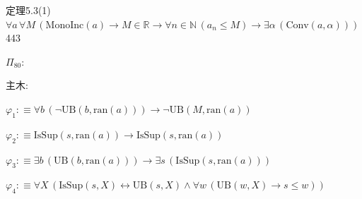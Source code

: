 \begin{fullproof}{定理5.3(1)}{$\forall a\,\forall M\,(\mathrm{MonoInc}(a) \to M \in \mathbb{R} \to \forall n \in \mathbb{N}\,(a_{n} \leq M) \to \exists \alpha\,(\mathrm{Conv}(a,\alpha)))$}{443}
\begin{ptree}
\noLine
{}
\end{ptree}
\noindent$\Pi_{80}$:
\begin{ptree}
\noLine
{}
\noLine
{}
\end{ptree}
\noindent 主木:
\begin{ptree}
\noLine
{}
\noLine
{}
\end{ptree}
\begin{abbrevlist}
\item $\varphi_{1} :\equiv \forall b\,(\neg \mathrm{UB}(b,\mathrm{ran}(a))) \to \neg \mathrm{UB}(M,\mathrm{ran}(a))$
\item $\varphi_{2} :\equiv \mathrm{IsSup}(s,\mathrm{ran}(a)) \to \mathrm{IsSup}(s,\mathrm{ran}(a))$
\item $\varphi_{3} :\equiv \exists b\,(\mathrm{UB}(b,\mathrm{ran}(a))) \to \exists s\,(\mathrm{IsSup}(s,\mathrm{ran}(a)))$
\item $\varphi_{4} :\equiv \forall X\,(\mathrm{IsSup}(s,X) \leftrightarrow \mathrm{UB}(s,X) \land \forall w\,(\mathrm{UB}(w,X) \to s \leq w))$

\end{abbrevlist}
\end{fullproof}
